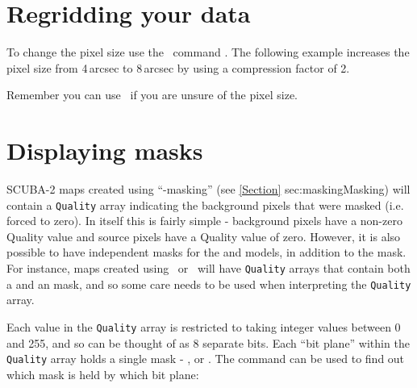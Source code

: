 \section{Regridding your data}
\label{sec:regriddata}

To change the pixel size use the \Kappa\ command \compave. The
following example increases the pixel size from 4\,arcsec to 8\,arcsec
by using a compression factor of 2.

\begin{terminalv}
\end{terminalv}

\begin{tip}
  Remember you can use \ndftrace\ if you are unsure of the pixel size.
\end{tip}



\section{Displaying masks}
\label{sec:maskshow}

SCUBA-2 maps created using ``-masking'' (see \cref{Section}
{sec:masking}{Masking}) will contain a \texttt{Quality} array indicating the
background pixels that were masked (i.e. forced to zero). In itself this
is fairly simple - background pixels have a non-zero Quality value and
source pixels have a Quality value of zero. However, it is also possible
to have independent masks for the  and  models,
in addition to the  mask. For instance, maps created using
\brightextended\ or \jsageneric\ will have \texttt{Quality} arrays that
contain both a  and an  mask, and so some care needs
to be used when interpreting the \texttt{Quality} array.

Each value in the \texttt{Quality} array is restricted to taking integer values
between 0 and 255, and so can be thought of as 8 separate bits. Each ``bit
plane'' within the \texttt{Quality} array holds a single mask - ,
 or . The 
command can be used to find out which mask is held by which bit plane:

